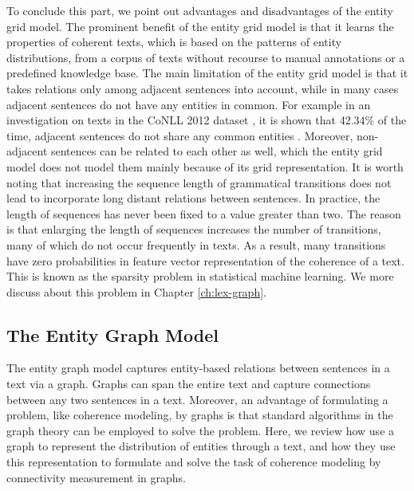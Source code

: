 To conclude this part, we point out advantages and disadvantages of the entity grid model. 
The prominent benefit of the entity grid model is that it learns the properties of coherent texts, which is based on the patterns of entity distributions, from a corpus of texts without recourse to manual annotations or a predefined knowledge base.
The main limitation of the entity grid model is that it takes relations only among adjacent sentences into account, while in many cases adjacent sentences do not have any entities in common. 
For example in an investigation on texts in the CoNLL 2012 dataset \cite{pradhan12}, it is shown that 42.34\% of the time, adjacent sentences do not share any common entities \cite{zhangmuyu15}. 
Moreover, non-adjacent sentences can be related to each other as well, which the entity grid model does not model them mainly because of its grid representation. 
It is worth noting that increasing the sequence length of grammatical transitions  does not lead to incorporate long distant relations between sentences.  
In practice, the length of sequences has never been fixed to a value greater than two. 
The reason is that enlarging the length of sequences increases the number of transitions, many of which do not occur frequently in texts. 
As a result, many transitions have zero probabilities in feature vector representation of the coherence of a text. 
This is known as the sparsity problem in statistical machine learning. 
We more discuss about this problem in Chapter \ref{ch:lex-graph}. 

\subsection{The Entity Graph Model}
\label{sec:ent_graph}

The entity graph model \cite{guinaudeau13} captures entity-based relations between sentences in a text via a graph. 
Graphs can span the entire text and capture connections between any two sentences in a text. 
Moreover, an advantage of formulating a problem, like coherence modeling, by graphs is that standard algorithms in the graph theory can be employed to solve the problem. 
Here, we review how  use a graph to represent the distribution of entities through a text, and how they use this representation to formulate and solve the task of coherence modeling by connectivity measurement in graphs.  

